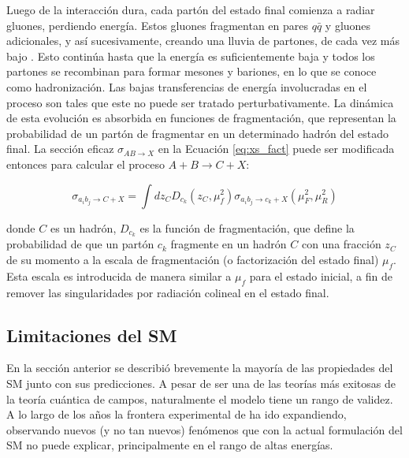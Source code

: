 Luego de la interacción dura, cada partón del estado final comienza a radiar gluones,
perdiendo energía. Estos gluones fragmentan en pares $q\bar{q}$ y gluones adicionales, y así sucesivamente, creando una lluvia de partones, de cada vez más bajo \pt. Esto continúa hasta
que la energía es suficientemente baja y todos los partones se recombinan para formar
mesones y bariones, en lo que se conoce como hadronización. Las bajas transferencias de
energía involucradas en el proceso son tales que este no puede ser tratado perturbativamente. La dinámica de esta evolución es absorbida en funciones de fragmentación, que
representan la probabilidad de un partón de fragmentar en un determinado hadrón del
estado final. La sección eficaz $\sigma_{AB\to X}$ en la Ecuación \ref{eq:xs_fact} puede ser modificada entonces para
calcular el proceso $A + B \to C + X$:

\begin{equation}
	\sigma_{a_i b_j \to C+X} = \int dz_{C} D_{c_k}(z_C, \mu_{f}^2) \sigma_{a_i b_j \to c_k + X}(\mu_{F}^2, \mu_{R}^2)
\end{equation}

donde $C$ es un hadrón, $D_{c_k}$ es la función de fragmentación, que define la probabilidad
de que un partón $c_k$ fragmente en un hadrón $C$ con una fracción $z_C$ de su momento a la
escala de fragmentación (o factorización del estado final) $\mu_{f}$. Esta escala es introducida
de manera similar a $\mu_{f}$ para el estado inicial, a fin de remover las singularidades por
radiación colineal en el estado final.














\subsection{Limitaciones del SM}

En la sección anterior se describió brevemente la mayoría de las propiedades del SM junto con sus predicciones. A pesar de ser una de las teorías más exitosas de la teoría cuántica de campos, naturalmente el modelo tiene un rango de validez. A lo largo de los años la frontera experimental de ha ido expandiendo, observando nuevos (y no tan nuevos) fenómenos que con la actual formulación del SM no puede explicar, principalmente en el rango de altas energías.

